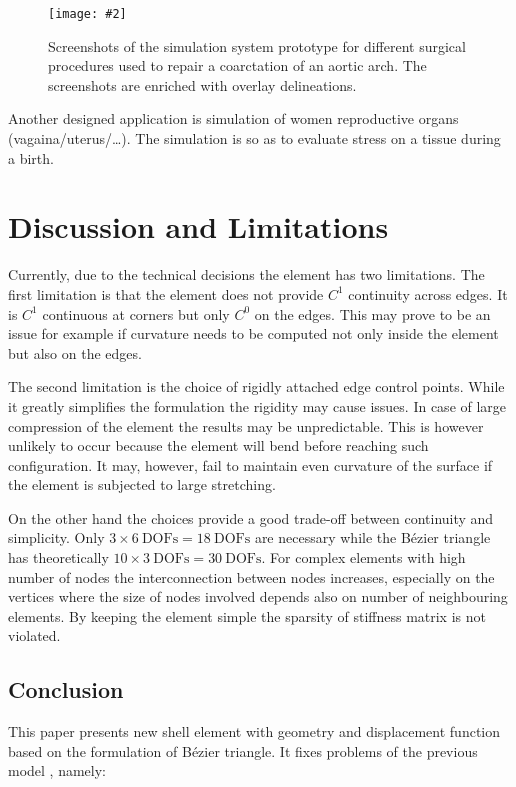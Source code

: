 \documentclass{egpubl}
\newcommand{\FigureW}[3]{%
\begin{figure*}[htb]
  \centering
  \texttt{[image: \#2]}
  \caption{\label{fig-#2}#3}
\end{figure*}}
\begin{document}
\FigureW{0.75\linewidth}{chd}
{Screenshots of the simulation system prototype for different surgical
procedures used to repair a coarctation of an aortic arch. The screenshots
are enriched with overlay delineations.}

Another designed application is simulation of women reproductive organs
(vagaina/uterus/\ldots). 
The simulation is so as to evaluate
stress on a tissue during a birth.



\section{Discussion and Limitations} %

Currently, due to the technical decisions the element has two limitations.
The first limitation is that the element does not provide $C^1$ continuity
across edges. It is $C^1$ continuous at corners but only $C^0$ on the
edges. This may prove to be an issue for example if curvature needs to be
computed not only inside the element but also on the edges.

The second limitation is the choice of rigidly attached edge control
points. While it greatly simplifies the formulation the rigidity may cause
issues. In case of large compression of the element the results may be
unpredictable. This is however unlikely to occur because the element will
bend before reaching such configuration. It may, however, fail to maintain
even curvature of the surface if the element is subjected to large
stretching.

On the other hand the choices provide a good trade-off between continuity
and simplicity. Only $ 3 \times 6~\mathrm{DOFs} = 18~\mathrm{DOFs}$ are
necessary while the B\'ezier triangle has theoretically $ 10 \times
3~\mathrm{DOFs} = 30~\mathrm{DOFs}$. For complex elements with high number
of nodes the interconnection between nodes increases, especially on the
vertices where the size of nodes involved depends also on number of
neighbouring elements. By keeping the element simple the sparsity of
stiffness matrix is not violated.


\subsection{Conclusion} %

This paper presents new shell element with geometry and displacement
function based on the formulation of B\'ezier triangle. It fixes problems
of the previous model \cite{Comas2010c}, namely:
\end{document}

